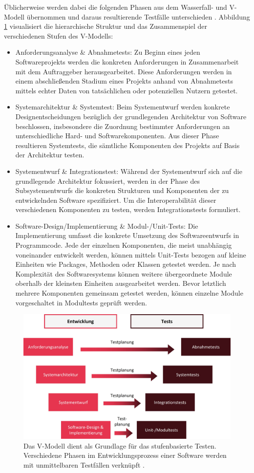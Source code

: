 Üblicherweise werden dabei die folgenden Phasen aus dem Wasserfall- und V-Modell übernommen und daraus resultierende Testfälle unterschieden \cite[S. 5 f.]{ammann2008introduction}. Abbildung \ref{fig:vmodell} visualisiert die hierarchische Struktur und das Zusammenspiel der verschiedenen Stufen des V-Modells:
\begin{itemize}
\item Anforderungsanalyse \& Abnahmetests: Zu Beginn eines jeden Softwareprojekts  werden die konkreten Anforderungen in Zusammenarbeit mit dem Auftraggeber herausgearbeitet. Diese Anforderungen werden in einem abschließenden Stadium eines Projekts anhand von Abnahmetests mittels echter Daten von tatsächlichen oder potenziellen Nutzern getestet.
\item Systemarchitektur \& Systemtest: Beim Systementwurf werden konkrete Designentscheidungen bezüglich der grundlegenden Architektur von Software beschlossen, insbesondere die Zuordnung bestimmter Anforderungen an unterschiedliche Hard- und Softwarekomponenten. Aus dieser Phase resultieren Systemtests, die sämtliche Komponenten des Projekts auf Basis der Architektur testen. 
\item Systementwurf \& Integrationstest: Während der Systementwurf sich auf die grundlegende Architektur fokussiert, werden in der Phase des Subsystementwurfs die konkreten Strukturen und Komponenten der zu entwickelnden Software spezifiziert. Um die Interoperabilität dieser verschiedenen Komponenten zu testen, werden Integrationstests formuliert.
\item Software-Design/Implementierung \& Modul-/Unit-Tests: Die Implementierung umfasst die konkrete Umsetzung des Softwareentwurfs in Programmcode. Jede der einzelnen Komponenten, die meist unabhängig voneinander entwickelt werden, können mittels Unit-Tests bezogen auf kleine Einheiten wie Packages, Methoden oder Klassen getestet werden. Je nach Komplexität des Softwaresystems können weitere übergeordnete Module oberhalb der kleinsten Einheiten ausgearbeitet werden. Bevor letztlich mehrere Komponenten gemeinsam getestet werden, können einzelne Module vorgeschaltet in Modultests geprüft werden.
\end{itemize}

\begin{figure}[!htb]
\centering
\includegraphics[width=0.7\columnwidth]{images/V_Modell.jpg}
\caption{Das V-Modell dient als Grundlage für das stufenbasierte Testen. Verschiedene Phasen im Entwicklungsprozess einer Software werden mit unmittelbaren Testfällen verknüpft \cite[S. 101]{craig2002systematic}.}
\label{fig:vmodell}
\end{figure}


